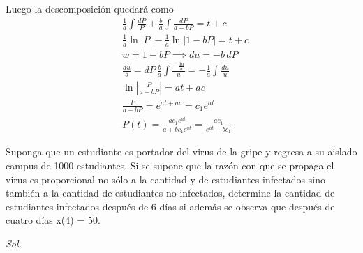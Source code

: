 Luego la descomposición quedará como
\begin{align*}
    &\frac{1}{a}\int \frac{dP}{P} + \frac{b}{a}\int \frac{dP}{a - bP} = t + c\\
    &\frac{1}{a}\ln{\left\lvert P\right\rvert } - \frac{1}{a}\ln{\left\lvert 1 - bP\right\rvert } = t + c\\
    &w = 1 - bP\implies du =- b\,dP\\
    &\frac{du}{ b} = dP\, \frac{b}{a}\int \frac{- \frac{du}{b}}{u} =- \frac{1}{a}\int \frac{du}{u}\\
    &\ln{\left\lvert \frac{P}{a - bP}\right\rvert } = at + ac\\
    &\frac{P}{a - bP} = e^{at + ac} =c_1e^{at}\\
    &P(t) = \frac{ac_1e^{at}}{a + bc_1e^{at}} = \frac{ac_{1}}{e^{ at} + bc_1}
\end{align*}

\begin{problem}
    Suponga que un estudiante es portador del virus de la gripe y regresa a su aislado campus de 1000 estudiantes. Si se supone que la razón con que se propaga el virus es proporcional no sólo a la cantidad y de estudiantes infectados sino también a la cantidad de estudiantes no infectados, determine la cantidad de estudiantes infectados después de 6 días si además se observa que después de cuatro días x(4) = 50.
\end{problem}

\textit{ Sol. }

